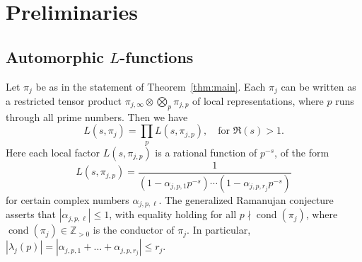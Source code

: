 \documentclass[11pt]{amsart}
\theoremstyle{remark}
\numberwithin{theorem}{section}
\numberwithin{equation}{section}
\newcommand{\Z}{\mathbb{Z}}
\DeclareMathOperator{\cond}{cond}
\begin{document}
\section{Preliminaries}
\subsection{Automorphic $L$-functions}
Let $\pi_j$ be as in the statement of Theorem~\ref{thm:main}. Each
$\pi_j$ can be written as a restricted tensor product
$\pi_{j,\infty}\otimes\bigotimes_p\pi_{j,p}$ of local representations,
where $p$ runs through all prime numbers.  Then we have
\begin{equation}\label{eq:l_def_1}
L(s,\pi_j)=\prod_pL(s,\pi_{j,p}),\quad\text{for }\Re(s)>1.
\end{equation}
Here each local factor $L(s,\pi_{j,p})$ is a rational function of
$p^{-s}$, of the form
\begin{equation}\label{eq:l_def_2}
L(s,\pi_{j,p})=\frac1{(1-\alpha_{j,p,1}p^{-s})\cdots(1-\alpha_{j,p,r_j}p^{-s})}
\end{equation}
for certain complex numbers $\alpha_{j,p,\ell}$. The generalized Ramanujan
conjecture asserts that
$|\alpha_{j,p,\ell}|\le 1$, with equality holding for all
$p\nmid\cond(\pi_j)$, where $\cond(\pi_j)\in\Z_{>0}$ is the conductor of
$\pi_j$. In particular,
$|\lambda_j(p)|=|\alpha_{j,p,1}+\ldots+\alpha_{j,p,r_j}|\le r_j$.
\end{document}
